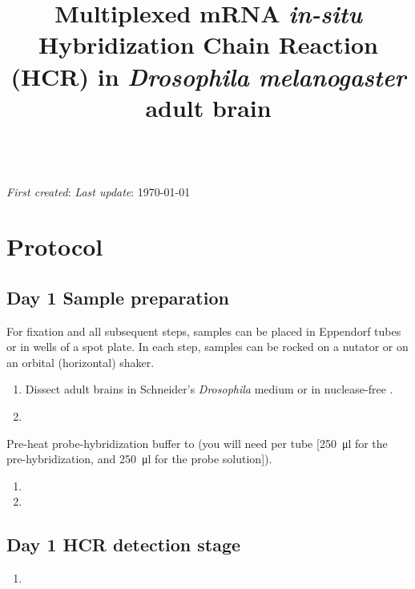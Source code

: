\documentclass[10pt]{report}
\makeatletter
\renewcommand\maketitle{
{\begin{center}
{\Large \bfseries \@title }\\
{\small \emph{First created}: \DTMdisplaydate{2024}{02}{11}{-1}\hfill%
\setstretch{1.0} \small \hfill \emph{Last update}: \today}
\end{center}}} %
\makeatother
\begin{document}

\title{\vspace{-3em} Multiplexed mRNA \textit{in-situ} Hybridization Chain Reaction (HCR) in \emph{Drosophila melanogaster} adult brain}
\maketitle
\thispagestyle{plain}

\section*{\vspace{-1em} \textendash{} Protocol \textendash{}}

\subsection*{Day 1 \textendash{} Sample preparation}

\alert{For fixation and all subsequent steps, samples can be placed in Eppendorf tubes or in wells of a spot plate.}
\alert{In each step, samples can be rocked on a nutator or on an orbital (horizontal) shaker.}

\begin{enumerate}[series = steps]
	\item Dissect adult brains in Schneider's \textit{Drosophila} medium or in nuclease-free \pbs.
	\item {}
\end{enumerate}

\bigskip\alert{Pre-heat probe-hybridization buffer to \thirtysevendegree{} (you will need \fivehunmicrol per tube [\qty{250}{\ul} for the pre-hybridization, and \qty{250}{\ul} for the probe solution]).}
	
\begin{enumerate}[resume = steps]
	\item {}
	\item {}
\end{enumerate}

\subsection*{Day 1 \textendash{} HCR detection stage}
\begin{enumerate}[series = steps]
	\item {}
\end{enumerate}
\end{document}
